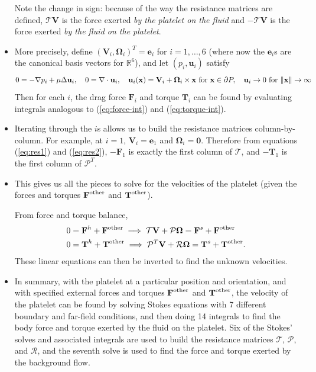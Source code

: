 \documentclass{article}
\newcommand{\tn}{\textnormal}
\newcommand{\vect}[1]{\boldsymbol{\mathbf{#1}}}
\def\R{\mathbb{R}}
\begin{document}
\begin{itemize}
  Note the change in sign: because of the way the resistance matrices
  are defined, $\mathcal{T} \vect{V}$ is the force exerted \emph{by
    the platelet on the fluid} and $-\mathcal{T} \vect{V}$ is the
  force exerted \emph{by the fluid on the platelet}. 
\item More precisely, define
  $(\vect{V}_i, \vect{\Omega}_i)^T = \vect{e}_i$ for
  $i = 1, \hdots, 6$ (where now the $\vect{e}_i$s are the canonical
  basis vectors for $\R^6$), and let $(p_i, \vect{u}_i)$ satisfy
  \begin{equation}
    \label{eq:unit-cmp}
    0 = -\nabla p_i + \mu \Delta \vect{u}_i, \quad 0 = \nabla
    \cdot \vect{u}_i, \quad \vect{u}_i(\vect{x}) =
    \vect{V}_i + \vect{\Omega}_i \times \vect{x} \tn{
      for } \vect{x} \in \partial P, \quad \vect{u}_i
    \rightarrow 0 \tn{ for } \|\mathbf{x}\| \rightarrow
    \infty
  \end{equation}
  Then for each $i$, the drag force $\vect{F}_i$ and torque
  $\vect{T}_i$ can be found by evaluating integrals analogous to
  (\ref{eq:force-int}) and (\ref{eq:torque-int}).
\item Iterating through the $i$s allows us to build the resistance
  matrices column-by-column. For example, at $i = 1$, $\vect{V}_i =
  \vect{e}_1$ and $\vect{\Omega}_i = \vect{0}$. Therefore from
  equations (\ref{eq:res1}) and (\ref{eq:res2}), $-\vect{F}_1$ is
  exactly the first column of $\mathcal{T}$, and $-\vect{T}_1$ is the
  first column of $\mathcal{P}^T$.
\item This gives us all the pieces to solve for the velocities of the
  platelet (given the forces and torques $\vect{F}^\tn{other}$
  and $\vect{T}^\tn{other}$).

  From force and torque balance,
  \begin{align}
    0 &= \vect{F}^h + \vect{F}^\tn{other} \implies \mathcal{T}
        \vect{V} + \mathcal{P} \vect{\Omega} = \vect{F}^s +
        \vect{F}^\tn{other} \\
    0 &= \vect{T}^h + \vect{T}^\tn{other} \implies \mathcal{P}^T
        \vect{V} + \mathcal{R} \vect{\Omega} = \vect{T}^s +
        \vect{T}^\tn{other}.
  \end{align}
  These linear equations can then be inverted to find the unknown
  velocities.
\item In summary, with the platelet at a particular position and
  orientation, and with specified external forces and torques
  $\vect{F}^\tn{other}$ and $\vect{T}^\tn{other}$, the velocity of the
  platelet can be found by solving Stokes equations with 7 different
  boundary and far-field conditions, and then doing 14 integrals to
  find the body force and torque exerted by the fluid on the
  platelet. Six of the Stokes' solves and associated integrals are
  used to build the resistance matrices $\mathcal{T}$, $\mathcal{P}$,
  and $\mathcal{R}$, and the seventh solve is used to find the force
  and torque exerted by the background flow.
\end{itemize}
\end{document}
